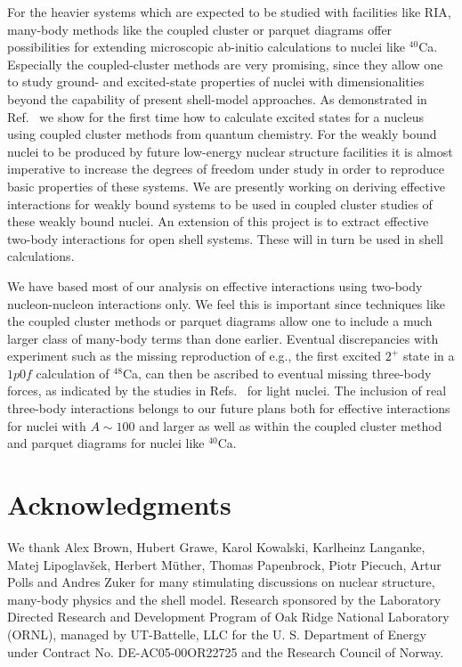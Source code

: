 \documentclass{article}
\begin{document}
For the heavier systems which are expected to be 
studied with facilities like RIA, many-body methods like the 
coupled cluster or parquet diagrams offer possibilities for extending
microscopic ab-initio calculations to nuclei like $^{40}$Ca.
Especially the coupled-cluster methods are
very promising, since they allow one to study 
ground- and excited-state properties of nuclei
with dimensionalities beyond the capability of present shell-model
approaches. As demonstrated in Ref.~\cite{kowalski03n} we 
show for the first time how to calculate 
excited states for a nucleus using coupled cluster 
methods from quantum chemistry.
For the weakly bound nuclei to be produced by future low-energy 
nuclear structure facilities
it is almost imperative to increase the
degrees of freedom under study in order to reproduce
basic properties of these systems. 
We are presently working on deriving effective interactions 
for weakly bound systems to be used in coupled cluster 
studies of these weakly bound nuclei. An extension of this project is to extract effective 
two-body interactions for open shell systems. These will in turn  
be used in shell calculations. 

We have based most of our analysis on effective interactions
using two-body nucleon-nucleon interactions only. 
We feel this is important since
techniques like the coupled cluster methods or 
parquet diagrams allow one to include a much larger
class of many-body terms than done earlier. Eventual discrepancies 
with experiment 
such as the missing reproduction of e.g., the first 
excited $2^+$ state in a $1p0f$ calculation
of $^{48}$Ca, can then be ascribed to eventual 
missing three-body forces, as indicated by the studies
in Refs.~\cite{bob1,bob2,bob3,apr98,petr_erich2002,petr_erich2003} 
for light nuclei. 
The inclusion of real three-body interactions belongs 
to our future plans both for effective 
interactions for nuclei with $A\sim 100$ and larger 
as well as within the coupled cluster method and
parquet diagrams for nuclei like $^{40}$Ca.

\section*{Acknowledgments}

We thank Alex Brown, Hubert Grawe, Karol Kowalski, Karlheinz Langanke, Matej Lipoglav\v{s}ek, 
Herbert M\"uther, Thomas Papenbrock, Piotr Piecuch, Artur Polls and Andres Zuker 
for many stimulating discussions on nuclear structure, 
many-body physics and the shell model.
Research sponsored by the Laboratory Directed Research and Development
Program of Oak Ridge National Laboratory (ORNL), managed by
UT-Battelle, LLC for the U. S.  Department of Energy under
Contract No. DE-AC05-00OR22725 and the Research Council of Norway. 
\end{document}
